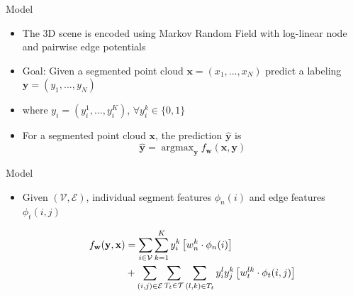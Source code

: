 \documentclass{beamer}
\DeclareMathOperator*{\argmax}{argmax}
\newcommand{\x}{{\mathbf x}}     %
\newcommand{\xs}[1]{{x_{#1}}}    %
\newcommand{\y}{{\mathbf y}}     %
\newcommand{\ys}[1]{{y_{#1}}}    %
\newcommand{\ysc}[2]{{y_{#1}^{#2}}}    %
\newcommand{\fn}[1]{{\phi_n(#1)}}      %
\newcommand{\fe}[3]{{\phi_{#1}(#2,#3)}}%
\newcommand{\w}{{\mathbf w}}           %
\newcommand{\wn}[1]{{w_n^{#1}}}        %
\newcommand{\we}[3]{{w_{#1}^{#2#3}}}   %
\newcommand{\df}[3]{{f_{#3}(#1,#2)}}   %
\begin{document}
\begin{frame}{Model}
\begin{itemize}

 \item The 3D scene is encoded using Markov Random Field with log-linear node and pairwise edge potentials
 
 
\item Goal: Given a segmented point cloud $\x=(\xs{1},...,\xs{N})$  predict a labeling $\y=(\ys{1},...,\ys{N})$

\item where $\ys{i}=(\ysc{i}{1},...,\ysc{i}{K})$,  $ \forall \ysc{i}{k} \in \{0,1\}$ 


\item For a segmented point cloud $\x$, the prediction $\hat{\y}$ is 
\begin{equation} \label{eq:argmax}
\hat{\y} = \argmax_\y \df{\x}{\y}{\w}
\end{equation}

\end{itemize}
\end{frame}


\begin{frame}{Model}
\begin{itemize}

\item Given $(\mathcal{V},\mathcal{E})$, individual segment features $\fn{i}$ and edge features $\fe{t}{i}{j}$

\begin{equation} \label{eq:model}
\begin{split}
\df{\y}{\x}{\w} & = \sum_{i \in \mathcal{V}} \sum_{k=1}^{K} \ysc{i}{k} \left[\wn{k} \cdot \fn{i} \right] \\
 & + \sum_{(i,j)\in \mathcal{E}}   \sum_{T_t \in {\cal T}}  \sum_{(l,k)\in T_t} \ysc{i}{l} \ysc{j}{k}  \left[\we{t}{l}{k} \cdot \fe{t}{i}{j}\right] 
 \end{split}
\end{equation}

\end{itemize}
\end{frame}
\end{document}
